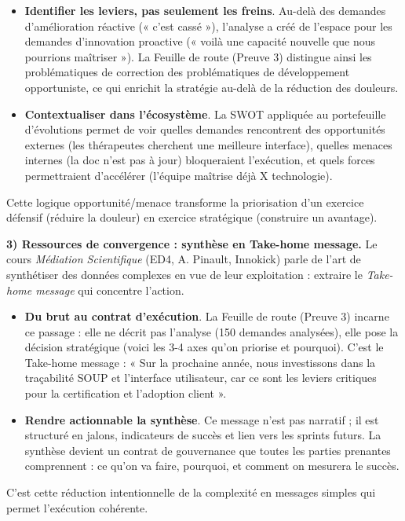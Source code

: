 \begin{itemize}
  \item \textbf{Identifier les leviers, pas seulement les freins}. Au-delà des demandes d'amélioration réactive (« c'est cassé »), l'analyse a créé de l'espace pour les demandes d'innovation proactive (« voilà une capacité nouvelle que nous pourrions maîtriser »). La Feuille de route (Preuve 3) distingue ainsi les problématiques de correction des problématiques de développement opportuniste, ce qui enrichit la stratégie au-delà de la réduction des douleurs.
  \item \textbf{Contextualiser dans l'écosystème}. La SWOT appliquée au portefeuille d'évolutions permet de voir quelles demandes rencontrent des opportunités externes (les thérapeutes cherchent une meilleure interface), quelles menaces internes (la doc n'est pas à jour) bloqueraient l'exécution, et quels forces permettraient d'accélérer (l'équipe maîtrise déjà X technologie).
\end{itemize}

Cette logique opportunité/menace transforme la priorisation d'un exercice défensif (réduire la douleur) en exercice stratégique (construire un avantage).

\textbf{3) Ressources de convergence : synthèse en Take-home message.}
Le cours \textit{Médiation Scientifique} (ED4, A. Pinault, Innokick) parle de l'art de synthétiser des données complexes en vue de leur exploitation : extraire le \emph{Take-home message} qui concentre l'action.

\begin{itemize}
  \item \textbf{Du brut au contrat d'exécution}. La Feuille de route (Preuve 3) incarne ce passage : elle ne décrit pas l'analyse (150 demandes analysées), elle pose la décision stratégique (voici les 3-4 axes qu'on priorise et pourquoi). C'est le Take-home message : « Sur la prochaine année, nous investissons dans la traçabilité SOUP et l'interface utilisateur, car ce sont les leviers critiques pour la certification et l'adoption client ».
  \item \textbf{Rendre actionnable la synthèse}. Ce message n'est pas narratif ; il est structuré en jalons, indicateurs de succès et lien vers les sprints futurs. La synthèse devient un contrat de gouvernance que toutes les parties prenantes comprennent : ce qu'on va faire, pourquoi, et comment on mesurera le succès.
\end{itemize}

C'est cette réduction intentionnelle de la complexité en messages simples qui permet l'exécution cohérente.

